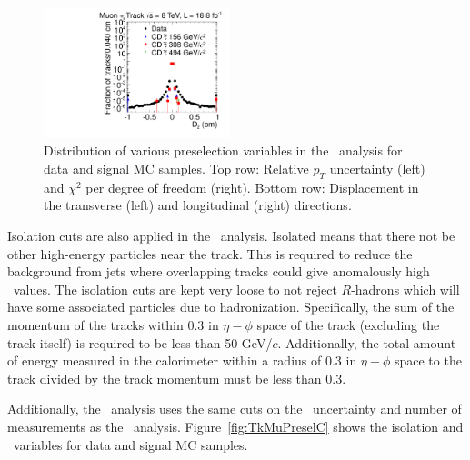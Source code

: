\begin{figure}
  \includegraphics[clip=false, trim=0.0cm 0cm 0.0cm 0cm, width=0.48\textwidth]{figures/tkmu/Selection_Comp_8TeV_GMStau_Dz_BS}
  \caption[Distribution of relative \pt\ uncertainty, $\chi^2$ per degree of freedom, and transverse and longitudinal
displacement in the \tktof\ analysis for data and signal MC samples.]
{Distribution of various preselection variables in the \tktof\ analysis for data and signal MC samples.
Top row: Relative $p_T$ uncertainty (left) and $\chi^2$ per degree of freedom (right).
Bottom row: Displacement in the transverse (left) and longitudinal (right) directions.}
    \label{fig:TkMuPreselB}
\end{figure}

Isolation cuts are also applied in the \tktof\ analysis. Isolated means that there not be other high-energy particles near the track.
This is required to reduce the background from jets where overlapping tracks could give
anomalously high \dedx\ values. The isolation cuts are kept very loose to not reject $R$-hadrons which will have some associated particles due to hadronization.
Specifically, the sum of the momentum of the tracks within 0.3 in $\eta-\phi$ 
space of the track (excluding the track itself) is required to be less than 50 GeV/$c$. Additionally, the total
amount of energy measured in the calorimeter within a radius of 0.3 in $\eta-\phi$ space to the track divided by the track momentum must be less than 0.3.

Additionally, the \tktof\ analysis uses the same cuts on the \invbeta\ uncertainty and number of measurements as the \muononly\ analysis.
Figure~\ref{fig:TkMuPreselC} shows the isolation and \invbeta\ variables for data and signal MC samples.

